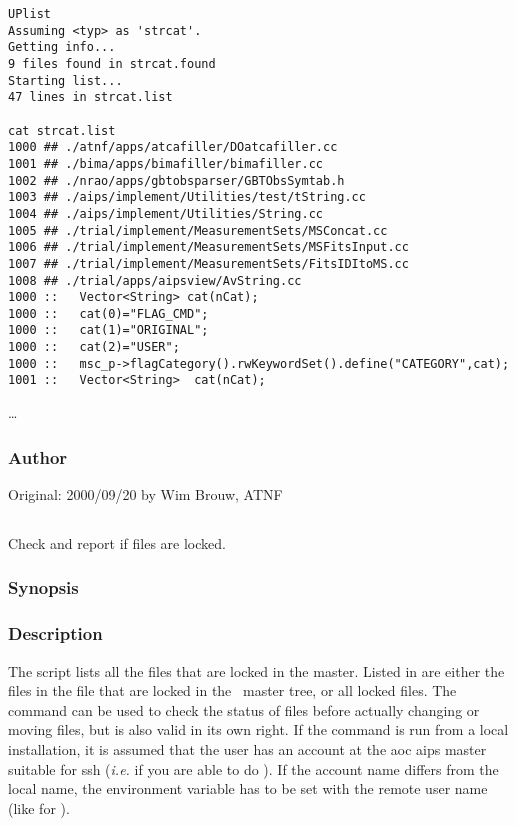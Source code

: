 \begin{verbatim}
UPlist
Assuming <typ> as 'strcat'.
Getting info...
9 files found in strcat.found
Starting list...
47 lines in strcat.list

cat strcat.list
1000 ## ./atnf/apps/atcafiller/DOatcafiller.cc
1001 ## ./bima/apps/bimafiller/bimafiller.cc
1002 ## ./nrao/apps/gbtobsparser/GBTObsSymtab.h
1003 ## ./aips/implement/Utilities/test/tString.cc
1004 ## ./aips/implement/Utilities/String.cc
1005 ## ./trial/implement/MeasurementSets/MSConcat.cc
1006 ## ./trial/implement/MeasurementSets/MSFitsInput.cc
1007 ## ./trial/implement/MeasurementSets/FitsIDItoMS.cc
1008 ## ./trial/apps/aipsview/AvString.cc
1000 ::   Vector<String> cat(nCat);
1000 ::   cat(0)="FLAG_CMD";
1000 ::   cat(1)="ORIGINAL"; 
1000 ::   cat(2)="USER"; 
1000 ::   msc_p->flagCategory().rwKeywordSet().define("CATEGORY",cat);
1001 ::   Vector<String>  cat(nCat);
\end{verbatim}
\ldots

\subsubsection*{Author}

Original: 2000/09/20 by Wim Brouw, ATNF


\newpage

\subsection{}
\label{UPlock}

Check and report if files are locked.

\subsubsection*{Synopsis}

\begin{synopsis}
\end{synopsis}

\subsubsection*{Description}

\noindent
The  script lists all the files that are locked in the
master. Listed in  are either the files in the
 file that are locked in the \aipspp\ master tree, or
all locked files.
The command can be used to check the status of files before actually changing
or moving files, but is also valid in its own right. If the command is run
from a local installation, it is assumed that the user has an account at the
aoc aips master suitable for ssh ({\em i.e.} if you are able to do
). If the account name differs from the local name, the
 environment variable has to be set with the remote user name
(like for ). 

